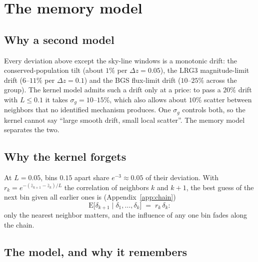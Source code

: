 \section{The memory model}
\label{sec:memory}

\subsection{Why a second model}
\label{sec:memwhy}

Every deviation above except the sky-line windows is a monotonic drift:
the conserved-population tilt (about $1\%$ per $\Delta z = 0.05$), the
LRG3 magnitude-limit drift ($6$--$11\%$ per $\Delta z = 0.1$) and the
BGS flux-limit drift ($10$--$25\%$ across the group).  The kernel model
admits such a drift only at a price: to pass a $20\%$ drift with
$L \leq 0.1$ it takes $\sigma_g = 10$--$15\%$, which also allows about
$10\%$ scatter between neighbors that no identified mechanism
produces.  One $\sigma_g$ controls both, so the kernel cannot say
``large smooth drift, small local scatter''.  The memory model
separates the two.

\subsection{Why the kernel forgets}
\label{sec:memforget}

At $L = 0.05$, bins $0.15$ apart share $e^{-3} \approx 0.05$ of their
deviation.  With $r_k = e^{-(\bar{z}_{k+1} - \bar{z}_k)/L}$ the
correlation of neighbors $k$ and $k+1$, the best guess of the next bin
given all earlier ones is (Appendix~\ref{app:chain})
\begin{equation}
  \mathrm{E}\bigl[\delta_{k+1} \mid \delta_1, \dots, \delta_k\bigr]
  \;=\; r_k\, \delta_k :
  \label{eq:memmarkov}
\end{equation}
only the nearest neighbor matters, and the influence of any one bin
fades along the chain.

\subsection{The model, and why it remembers}
\label{sec:memmodel}

